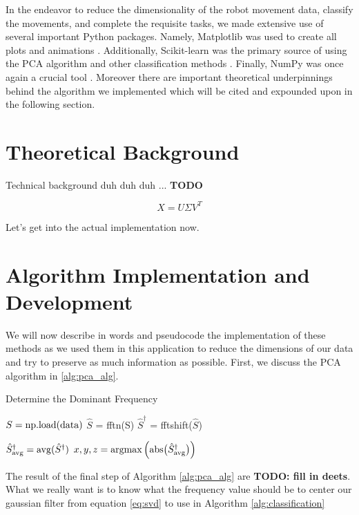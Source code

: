 \documentclass[11pt]{amsart}
\begin{document}
In the endeavor to reduce the dimensionality of the robot movement data, classify the movements, and complete the requisite tasks, we made extensive use of several important Python packages.
Namely, Matplotlib was used to create all plots and animations \cite{Hunter:2007}.
Additionally, Scikit-learn was the primary source of using the PCA algorithm and other classification methods \cite{scikit-learn}. 
Finally, NumPy was once again a crucial tool \cite{harris2020array}.
Moreover there are important theoretical underpinnings behind the algorithm we implemented which will be cited and expounded upon in the following section.

\section{Theoretical Background}\label{sec:theory}
Technical background duh duh duh ... \textbf{TODO}

\begin{equation}
X = U\Sigma V^T
\label{eq:svd}
\end{equation}

Let's get into the actual implementation now.

\section{Algorithm Implementation and Development}\label{sec:algorithms}
We will now describe in words and pseudocode the implementation of these methods as we used them in this application to reduce the dimensions of our data and try to preserve as much information as possible.
First, we discuss the PCA algorithm in \ref{alg:pca_alg}.

\begin{algorithm}
\caption{Determine the Dominant Frequency}\label{alg:pca_alg}
\begin{algorithmic}
\State $ S = {\rm np.load(data)}$ 
\State $\hat S$ = fftn(S)
\State $\hat S^\dag$ = fftshift($\hat S$) 

\State $\hat S^\dag_{\rm avg} = {\rm avg}(\hat S^\dag)$ 
\State $x, y, z = {\rm argmax} \left( {\rm abs} \big( \hat S^\dag_{\rm avg} \big) \right) $ 
\end{algorithmic}
\end{algorithm}

The result of the final step of Algorithm \ref{alg:pca_alg} are \textbf{TODO: fill in deets}.
What we really want is to know what the frequency value should be to center our gaussian filter from equation \eqref{eq:svd} to use in Algorithm \ref{alg:classification}
\end{document}

